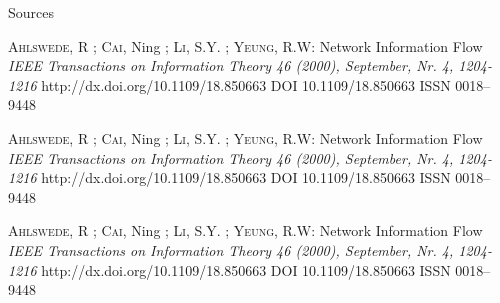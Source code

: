 \begin{frame}[allowframebreaks]{Sources}
\begin{thebibliography}{9}
    \textsc{Ahlswede}, R ; \textsc{Cai}, Ning  ; \textsc{Li},
      S.Y. ; \textsc{Yeung},  R.W:
    \newblock Network Information Flow
    \emph{IEEE Transactions on Information Theory 46 (2000), September, Nr. 4, 1204-1216}
    \newblock http://dx.doi.org/10.1109/18.850663
    \newblock DOI 10.1109/18.850663
    \newblock ISSN 0018–9448

    \textsc{Ahlswede}, R ; \textsc{Cai}, Ning  ; \textsc{Li},
      S.Y. ; \textsc{Yeung},  R.W:
    \newblock Network Information Flow
    \emph{IEEE Transactions on Information Theory 46 (2000), September, Nr. 4, 1204-1216}
    \newblock http://dx.doi.org/10.1109/18.850663
    \newblock DOI 10.1109/18.850663
    \newblock ISSN 0018–9448

    \textsc{Ahlswede}, R ; \textsc{Cai}, Ning  ; \textsc{Li},
      S.Y. ; \textsc{Yeung},  R.W:
    \newblock Network Information Flow
    \emph{IEEE Transactions on Information Theory 46 (2000), September, Nr. 4, 1204-1216}
    \newblock http://dx.doi.org/10.1109/18.850663
    \newblock DOI 10.1109/18.850663
    \newblock ISSN 0018–9448

  \end{thebibliography} 
  
\end{frame}
\multipleslidefalse